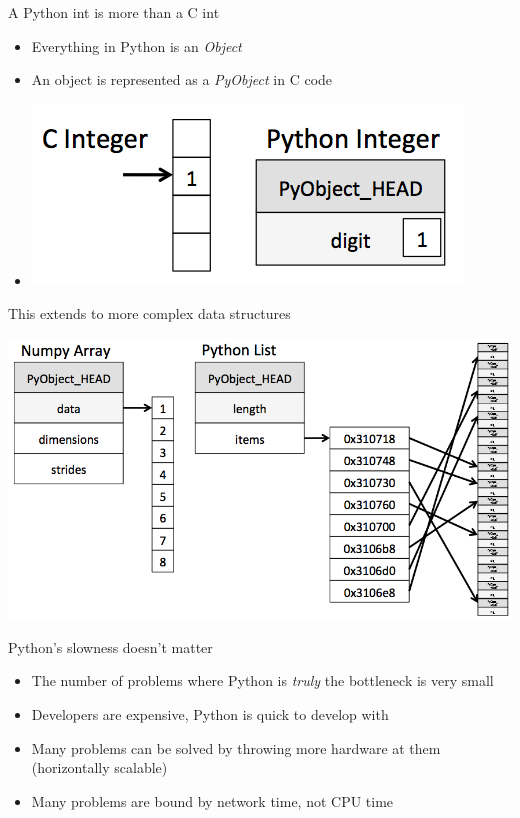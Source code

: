 \documentclass[12pt, aspectration=169]{beamer}
\begin{document}
    \begin{frame}{A Python int is more than a C int}
        \begin{itemize}
            \item Everything in Python is an \textit{Object}
            \item An object is represented as a \textit{PyObject} in C code
            \item[] \begin{center}
                      \includegraphics[scale=0.5]{static/images/cint_vs_pyint}
            \end{center}
        \end{itemize}
    \end{frame}

    \begin{frame}{This extends to more complex data structures}
        \begin{center}
              \includegraphics[scale=0.25]{static/images/array_vs_list}
        \end{center}
    \end{frame}

    \begin{frame}{Python's slowness doesn't matter}
        \begin{itemize}
            \item The number of problems where Python is \textit{truly} the bottleneck is very small
            \item Developers are expensive, Python is quick to develop with
            \item Many problems can be solved by throwing more hardware at them (horizontally scalable)
            \item Many problems are bound by network time, not CPU time
        \end{itemize}
    \end{frame}
\end{document}
